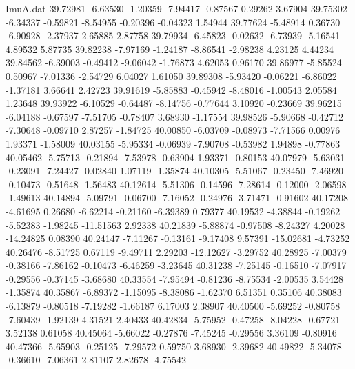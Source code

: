 \begin{filecontents}{ImuA.dat}
  39.72981   -6.63530   -1.20359   -7.94417   -0.87567    0.29262    3.67904
  39.75302   -6.34337   -0.59821   -8.54955   -0.20396   -0.04323    1.54944
  39.77624   -5.48914    0.36730   -6.90928   -2.37937    2.65885    2.87758
  39.79934   -6.45823   -0.02632   -6.73939   -5.16541    4.89532    5.87735
  39.82238   -7.97169   -1.24187   -8.86541   -2.98238    4.23125    4.44234
  39.84562   -6.39003   -0.49412   -9.06042   -1.76873    4.62053    0.96170
  39.86977   -5.85524    0.50967   -7.01336   -2.54729    6.04027    1.61050
  39.89308   -5.93420   -0.06221   -6.86022   -1.37181    3.66641    2.42723
  39.91619   -5.85883   -0.45942   -8.48016   -1.00543    2.05584    1.23648
  39.93922   -6.10529   -0.64487   -8.14756   -0.77644    3.10920   -0.23669
  39.96215   -6.04188   -0.67597   -7.51705   -0.78407    3.68930   -1.17554
  39.98526   -5.90668   -0.42712   -7.30648   -0.09710    2.87257   -1.84725
  40.00850   -6.03709   -0.08973   -7.71566    0.00976    1.93371   -1.58009
  40.03155   -5.95334   -0.06939   -7.90708   -0.53982    1.94898   -0.77863
  40.05462   -5.75713   -0.21894   -7.53978   -0.63904    1.93371   -0.80153
  40.07979   -5.63031   -0.23091   -7.24427   -0.02840    1.07119   -1.35874
  40.10305   -5.51067   -0.23450   -7.46920   -0.10473   -0.51648   -1.56483
  40.12614   -5.51306   -0.14596   -7.28614   -0.12000   -2.06598   -1.49613
  40.14894   -5.09791   -0.06700   -7.16052   -0.24976   -3.71471   -0.91602
  40.17208   -4.61695    0.26680   -6.62214   -0.21160   -6.39389    0.79377
  40.19532   -4.38844   -0.19262   -5.52383   -1.98245  -11.51563    2.92338
  40.21839   -5.88874   -0.97508   -8.24327    4.20028  -14.24825    0.08390
  40.24147   -7.11267   -0.13161   -9.17408    9.57391  -15.02681   -4.73252
  40.26476   -8.51725    0.67119   -9.49711    2.29203  -12.12627   -3.29752
  40.28925   -7.00379   -0.38166   -7.86162   -0.10473   -6.46259   -3.23645
  40.31238   -7.25145   -0.16510   -7.07917   -0.29556   -0.37145   -3.68680
  40.33554   -7.95494   -0.81236   -8.75534   -2.00535    3.54428   -1.35874
  40.35867   -6.89372   -1.15095   -8.38086   -1.62370    6.51351    0.35106
  40.38083   -6.13879   -0.80518   -7.19282   -1.66187    6.17003    2.38907
  40.40500   -5.69252   -0.80758   -7.60439   -1.92139    4.31521    2.40433
  40.42834   -5.75952   -0.47258   -8.04228   -0.67721    3.52138    0.61058
  40.45064   -5.66022   -0.27876   -7.45245   -0.29556    3.36109   -0.80916
  40.47366   -5.65903   -0.25125   -7.29572    0.59750    3.68930   -2.39682
  40.49822   -5.34078   -0.36610   -7.06361    2.81107    2.82678   -4.75542

\end{filecontents}
